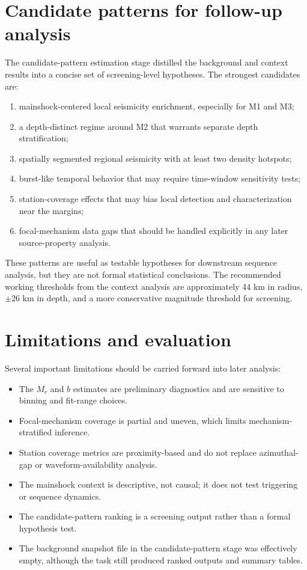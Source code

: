\documentclass[11pt]{article}
\begin{document}
\section{Candidate patterns for follow-up analysis}
The candidate-pattern estimation stage distilled the background and context results into a concise set of screening-level hypotheses. The strongest candidates are:
\begin{enumerate}[leftmargin=*]
    \item mainshock-centered local seismicity enrichment, especially for M1 and M3;
    \item a depth-distinct regime around M2 that warrants separate depth stratification;
    \item spatially segmented regional seismicity with at least two density hotspots;
    \item burst-like temporal behavior that may require time-window sensitivity tests;
    \item station-coverage effects that may bias local detection and characterization near the margins;
    \item focal-mechanism data gaps that should be handled explicitly in any later source-property analysis.
\end{enumerate}

These patterns are useful as testable hypotheses for downstream sequence analysis, but they are not formal statistical conclusions. The recommended working thresholds from the context analysis are approximately 44 km in radius, $\pm$26 km in depth, and a more conservative magnitude threshold for screening.

\section{Limitations and evaluation}
Several important limitations should be carried forward into later analysis:
\begin{itemize}[leftmargin=*]
    \item The $M_c$ and $b$ estimates are preliminary diagnostics and are sensitive to binning and fit-range choices.
    \item Focal-mechanism coverage is partial and uneven, which limits mechanism-stratified inference.
    \item Station coverage metrics are proximity-based and do not replace azimuthal-gap or waveform-availability analysis.
    \item The mainshock context is descriptive, not causal; it does not test triggering or sequence dynamics.
    \item The candidate-pattern ranking is a screening output rather than a formal hypothesis test.
    \item The background snapshot file in the candidate-pattern stage was effectively empty, although the task still produced ranked outputs and summary tables.
\end{itemize}
\end{document}
